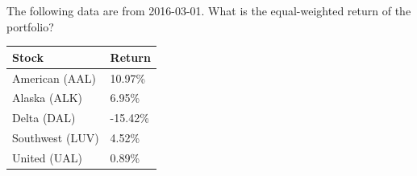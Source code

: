The following data are from 2016-03-01. What is the equal-weighted return of the portfolio?
\begin{center}
	\begin{tabular}{l|l}
		\textbf{Stock} & \textbf{Return} \\ \hline
		American (AAL) & 10.97\% \\
		Alaska (ALK) & 6.95\% \\
		Delta (DAL) & -15.42\% \\
		Southwest (LUV) & 4.52\% \\
		United (UAL) & 0.89\%\\\hline
	\end{tabular}
\end{center}
